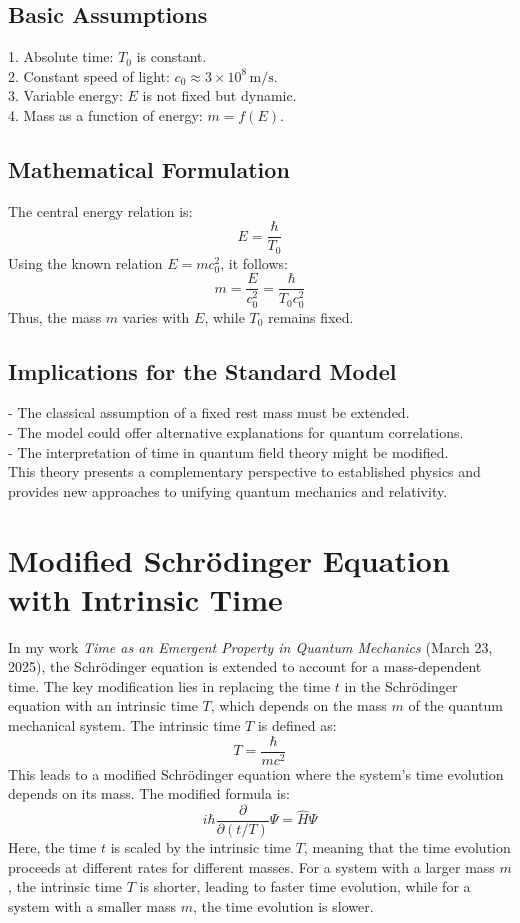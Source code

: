 \documentclass[a4paper,12pt]{article}
\begin{document}
	\subsection{Basic Assumptions}
	1. Absolute time: \( T_0 \) is constant. \\
	2. Constant speed of light: \( c_0 \approx 3 \times 10^8 \, \text{m/s} \). \\
	3. Variable energy: \( E \) is not fixed but dynamic. \\
	4. Mass as a function of energy: \( m = f(E) \).
	
	\subsection{Mathematical Formulation}
	The central energy relation is:
	\[
	E = \frac{\hbar}{T_0}
	\]
	Using the known relation \( E = m c_0^2 \), it follows:
	\[
	m = \frac{E}{c_0^2} = \frac{\hbar}{T_0 c_0^2}
	\]
	Thus, the mass \( m \) varies with \( E \), while \( T_0 \) remains fixed.
	
	\subsection{Implications for the Standard Model}
	- The classical assumption of a fixed rest mass must be extended. \\
	- The model could offer alternative explanations for quantum correlations. \\
	- The interpretation of time in quantum field theory might be modified. \\
	This theory presents a complementary perspective to established physics and provides new approaches to unifying quantum mechanics and relativity.
	
	\section{Modified Schrödinger Equation with Intrinsic Time}
	In my work \textit{Time as an Emergent Property in Quantum Mechanics} (March 23, 2025), the Schrödinger equation is extended to account for a mass-dependent time. The key modification lies in replacing the time \( t \) in the Schrödinger equation with an intrinsic time \( T \), which depends on the mass \( m \) of the quantum mechanical system. The intrinsic time \( T \) is defined as:
	\[
	T = \frac{\hbar}{m c^2}
	\]
	This leads to a modified Schrödinger equation where the system's time evolution depends on its mass. The modified formula is:
	\[
	i\hbar \frac{\partial}{\partial (t/T)} \Psi = \hat{H} \Psi
	\]
	Here, the time \( t \) is scaled by the intrinsic time \( T \), meaning that the time evolution proceeds at different rates for different masses. For a system with a larger mass \( m \), the intrinsic time \( T \) is shorter, leading to faster time evolution, while for a system with a smaller mass \( m \), the time evolution is slower.
	
\end{document}
